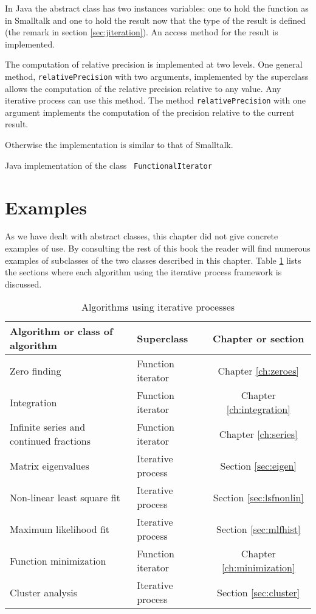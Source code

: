 \documentclass[twoside]{book}
\begin{document}
In Java the abstract class has two instances variables: one to
hold the function as in Smalltalk and one to hold the result now
that the type of the result is defined (\cf the remark in section
\ref{sec:jiteration}). An access method for the result is
implemented.

The computation of relative precision is implemented at two
levels. One general method, {\tt relativePrecision} with two
arguments, implemented by the superclass allows the computation of
the relative precision relative to any value. Any iterative
process can use this method. The method {\tt relativePrecision}
with one argument implements the computation of the precision
relative to the current result.

Otherwise the implementation is similar to that of Smalltalk.

\begin{listing} Java implementation of the class {\tt
FunctionalIterator}\label{lj:iterrel}

\end{listing}

\section{Examples}
As we have dealt with abstract classes, this chapter did not give
concrete examples of use. By consulting the rest of this book the
reader will find numerous examples of subclasses of the two
classes described in this chapter. Table \ref{tb:iteration} lists
the sections where each algorithm using the iterative process
framework is discussed.
\begin{table}[h]
  \centering
  \caption{Algorithms using iterative processes}\label{tb:iteration}
\vspace{1 ex}
\begin{tabular}{|l|l|c|} \hline
{\bf Algorithm or class of algorithm}&{\bf Superclass}&{\bf
Chapter or section}
\\ \hline Zero finding&Function iterator&Chapter \ref{ch:zeroes}
\\ \hline Integration&Function iterator&Chapter
\ref{ch:integration}
\\ \hline Infinite series and continued fractions&Function
iterator&Chapter \ref{ch:series}  \\ \hline Matrix
eigenvalues&Iterative process&Section \ref{sec:eigen}
\\ \hline Non-linear least square fit&Iterative process&Section
\ref{sec:lsfnonlin}
\\ \hline Maximum likelihood fit&Iterative process&Section \ref{sec:mlfhist} \\
\hline Function minimization&Function iterator&Chapter
\ref{ch:minimization}  \\ \hline Cluster analysis&Iterative
process&Section \ref{sec:cluster} \\ \hline
\end{tabular}

\end{table}


\ifx\wholebook\relax\else
\end{document}
